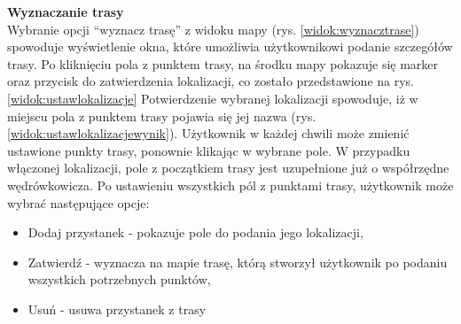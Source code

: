\noindent
\textbf{Wyznaczanie trasy} \\
\indent Wybranie opcji “wyznacz trasę” z widoku mapy (rys. \ref{widok:wyznacztrase}) spowoduje wyświetlenie okna, które umożliwia użytkownikowi podanie szczegółów trasy. Po kliknięciu pola z punktem trasy, na środku mapy pokazuje się marker oraz przycisk do zatwierdzenia lokalizacji, co zostało przedstawione na rys.\ref{widok:ustawlokalizacje} Potwierdzenie wybranej lokalizacji spowoduje, iż w miejscu pola z punktem trasy pojawia się jej nazwa (rys. \ref{widok:ustawlokalizacjewynik}). Użytkownik w każdej chwili może zmienić ustawione punkty trasy, ponownie klikając w wybrane pole. W przypadku włączonej lokalizacji, pole z początkiem trasy jest uzupełnione już o współrzędne wędrówkowicza. Po ustawieniu wszystkich pól z punktami trasy, użytkownik może wybrać następujące opcje:
\begin{itemize}
    \item Dodaj przystanek - pokazuje pole do podania jego lokalizacji,
    \item Zatwierdź - wyznacza na mapie trasę, którą stworzył użytkownik po podaniu wszystkich potrzebnych punktów,
    \item Usuń - usuwa przystanek z trasy
\end{itemize}

